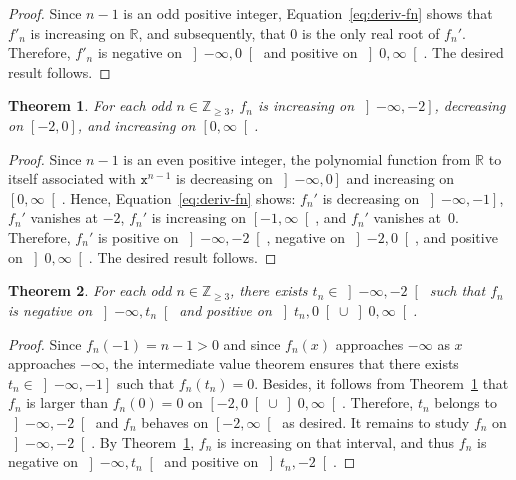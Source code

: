 \documentclass[12pt]{article}
\newcommand{\bZ}{\mathbb{Z}}
\newcommand{\bR}{\mathbb{R}}
\newcommand{\bN}[1]{\bZ_{\ge #1}}
\newcommand{\gtint}[1]{\left] #1, \infty \right[}
\newcommand{\geint}[1]{\left[ #1, \infty \right[}
\newcommand{\ltint}[1]{\left]- \infty, #1 \right[}
\newcommand{\leint}[1]{\left]- \infty, #1 \right]}
\newcommand{\ttx}{\mathtt{x}}
\newtheorem{theorem}{Theorem}
\begin{document}
 \begin{proof}
   Since $n - 1$ is an odd positive integer,
   Equation~\eqref{eq:deriv-fn} shows that
   $f'_n$ is increasing on $\bR$,
   and subsequently, that
   $0$ is the only real root of $f_n'$.
   Therefore,
   $f'_n$ is negative on $\ltint{0}$
   and 
   positive on $\gtint{0}$.
   The desired result follows.
 \end{proof}


 \begin{theorem} \label{thm:variation-odd}
   For each odd $n \in \bN{3}$, $f_n$ is
   increasing on $\leint{- 2}$,
   decreasing on $[- 2, 0]$, and
   increasing on $\geint{0}$.
 \end{theorem}

 \begin{proof}
   Since $n - 1$ is an even positive integer,
   the polynomial function from $\bR$ to itself associated with $\ttx^{n - 1}$ is decreasing on $\leint{0}$
   and increasing on $\geint{0}$.
   Hence, 
   Equation~\eqref{eq:deriv-fn} shows: 
   $f_n'$ is decreasing on $\leint{- 1}$,
   $f_n'$ vanishes at $- 2$,
   $f_n'$ is increasing on $\geint{- 1}$, and
   $f_n'$ vanishes at~$0$.
   Therefore, $f_n'$ is positive on $\ltint{- 2}$,
   negative on $\left]- 2, 0 \right[$, and
   positive on $\gtint{0}$.
   The desired result follows.
 \end{proof}
 
 \begin{theorem} \label{thm:tipping-point}
   For each odd  $n \in \bN{3}$,
   there exists $t_n \in \ltint{- 2}$ such that $f_n$ is 
   negative on $\left]- \infty, t_n \right[$
   and
   positive on $\left]t_n, 0 \right[ \cup \gtint{0}$.
 \end{theorem} 

 \begin{proof}
   Since $f_n(- 1) = n - 1 > 0$ and since $f_n(x)$ approaches $- \infty$ as $x$ approaches $- \infty$,
   the intermediate value theorem ensures that there exists $t_n \in \leint{- 1}$ such that $f_n(t_n) = 0$.
   Besides, it follows from Theorem~\ref{thm:variation-odd} that $f_n$ is larger than $f_n(0) = 0$  on
   $\left[- 2, 0 \right[ \cup \gtint{0}$.
   Therefore, $t_n$ belongs to $\ltint{- 2}$ and
   $f_n$ behaves on $\geint{- 2}$ as desired.
   It remains to study $f_n$ on $\ltint{-2}$.
   By Theorem~\ref{thm:variation-odd},
   $f_n$ is increasing on that interval,
   and thus $f_n$ is negative on $\ltint{t_n}$ and
   positive on $\left]t_n, - 2 \right[$.
 \end{proof}
\end{document}
